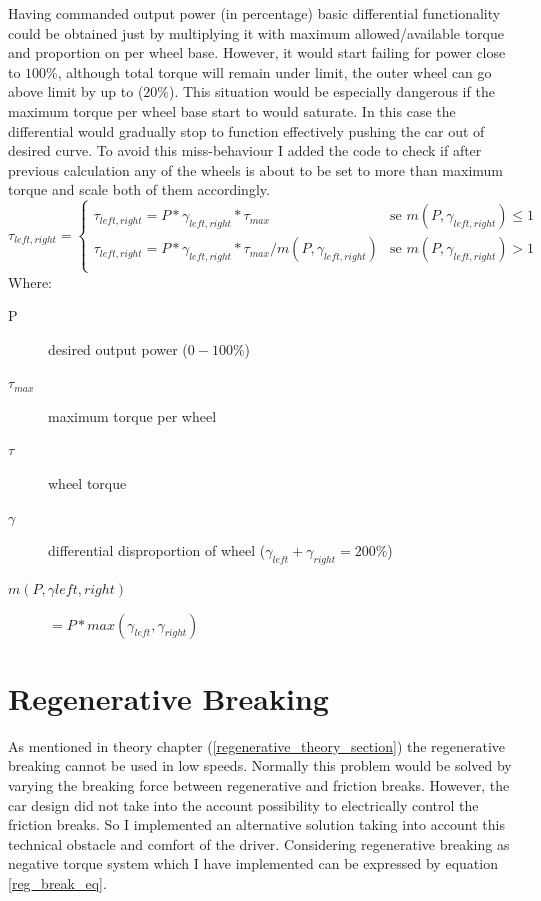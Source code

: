 Having commanded output power (in percentage) basic differential functionality could be obtained just by multiplying it with maximum allowed/available torque and proportion on per wheel base. However, it would start failing for power close to $100\% $, although total torque will remain under limit, the outer wheel can go above limit by up to ($20\% $).
This situation would be especially dangerous if the maximum torque per wheel base start to would saturate. In this case the differential would gradually stop to function effectively pushing the car out of desired curve.
To avoid this miss-behaviour I added the code to check if after previous calculation any of the wheels is about to be set to more than maximum torque and scale both of them accordingly.
\begin{equation}\label{diff_saf}
    \tau_{left,right} = \begin{cases}
        \tau_{left,right} = P * \gamma_{left,right} * \tau_{max} & \text{se $m(P,\gamma_{left,right}) \leq 1$}\\
        \tau_{left,right} = P * \gamma_{left,right} * \tau_{max} / m(P,\gamma_{left,right}) & \text{se $m(P,\gamma_{left,right}) > 1$}\\
    \end{cases}
\end{equation}
Where:
\begin{description}
    \item[P] desired output power ($0-100\%$)
    \item[$\tau_{max}$] maximum torque per wheel
    \item[$\tau$] wheel torque
    \item[$\gamma$] differential disproportion of wheel ($\gamma_{left}+\gamma_{right}=200\%$)
    \item[$m(P,\gamma{left,right})$] $= P * max(\gamma_{left},\gamma_{right})$
\end{description}

\section{Regenerative Breaking}
As mentioned in theory chapter (\ref{regenerative_theory_section}) the regenerative breaking cannot be used in low speeds. Normally this problem would be solved by varying the breaking force between regenerative and friction breaks. However, the car design did not take into the account possibility to electrically control the friction breaks. So I implemented an alternative solution taking into account this technical obstacle and comfort of the driver.
Considering regenerative breaking as negative torque system which I have implemented can be expressed by equation \ref{reg_break_eq}.


